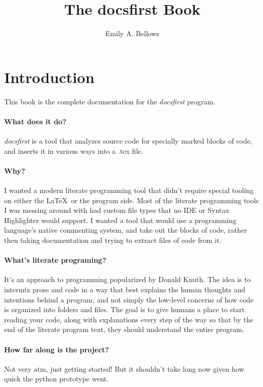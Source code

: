 \documentclass{article}
\title{The docsfirst Book}
\author{Emily A. Bellows}
\begin{document}
\maketitle

\section{Introduction}

This book is the complete documentation for the \emph{docsfirst} program.

\paragraph{What does it do?} \emph{docsfirst} is a tool that analyzes source
code for specially marked blocks of code, and inserts it in various ways
into a .tex file.

\paragraph{Why?} I wanted a modern literate programming tool that didn't require
special tooling on either the \LaTeX\ or the program side. Most of the
literate programming tools I was messing around with had custom file types that
no IDE or Syntax Highlighter would support. I wanted a tool that would use a
programming language's native commenting system, and take out the blocks of
code, rather then taking documentation and trying to extract files of code from
it.

\paragraph{What's literate programing?} It's an approach to programming
popularized by Donald Knuth. The idea is to intermix
prose and code in a way that best explains the human thoughts and intentions
behind a program, and not simply the low-level concerns of how code is organized
into folders and files. The goal is to give humans a place to start reading your
code, along with explanations every step of the way so that by the end of the
literate program text, they should understand the entire program.

\paragraph{How far along is the project?} Not very atm, just getting started!
But it shouldn't take long now given how quick the python prototype went.
\end{document}
